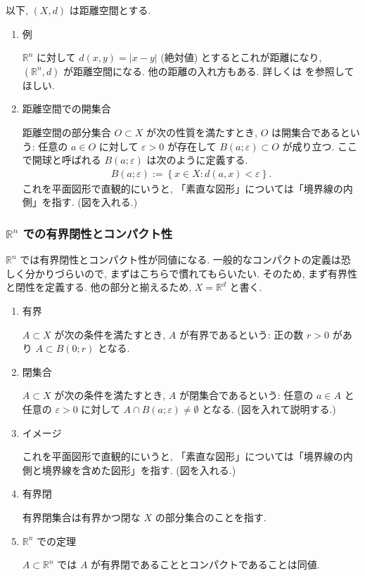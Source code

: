\documentclass[openany, a4paper, oneside]{jsbook}
\begin{document}
以下, $(X, d)$ は距離空間とする.
\begin{enumerate}
\item 例

$\mathbb{R}^n$ に対して $d (x, y) = \left| x - y \right|$ (絶対値) とするとこれが距離になり,
$(\mathbb{R}^n, d)$ が距離空間になる.
他の距離の入れ方もある.
詳しくは \cite{ShigeoIchiraku1, KazuoMatsuzaka1} を参照してほしい.
\item 距離空間での開集合

距離空間の部分集合 $O \subset X$ が次の性質を満たすとき, $O$ は開集合であるという:
任意の $a \in O$ に対して $\varepsilon > 0$ が存在して $B (a; \varepsilon) \subset O$ が成り立つ.
ここで開球と呼ばれる $B (a; \varepsilon)$ は次のように定義する.
\begin{align}
 B (a; \varepsilon)
 :=
 \left\{ x \in X : d (a, x) < \varepsilon \right\}.
\end{align}
これを平面図形で直観的にいうと, 「素直な図形」については「境界線の内側」を指す.
(図を入れる.)
\end{enumerate}
\subsubsection{$\mathbb{R}^n$ での有界閉性とコンパクト性}

$\mathbb{R}^n$ では有界閉性とコンパクト性が同値になる.
一般的なコンパクトの定義は恐しく分かりづらいので, まずはこちらで慣れてもらいたい.
そのため, まず有界性と閉性を定義する.
他の部分と揃えるため, $X = \mathbb{R}^d$ と書く.
\begin{enumerate}
\item 有界

$A \subset X$ が次の条件を満たすとき, $A$ が有界であるという:
正の数 $r > 0$ があり $A \subset B (0; r)$ となる.
\item 閉集合

$A \subset X$ が次の条件を満たすとき, $A$ が閉集合であるという:
任意の $a \in A$ と任意の $\varepsilon > 0$ に対して $A \cap B (a; \varepsilon) \neq \emptyset$ となる.
(図を入れて説明する.)
\item イメージ

これを平面図形で直観的にいうと, 「素直な図形」については「境界線の内側と境界線を含めた図形」を指す.
(図を入れる.)
\item 有界閉

有界閉集合は有界かつ閉な $X$ の部分集合のことを指す.
\item $\mathbb{R}^n$ での定理

$A \subset \mathbb{R}^n$ では $A$ が有界閉であることとコンパクトであることは同値.
\end{enumerate}
\end{document}
